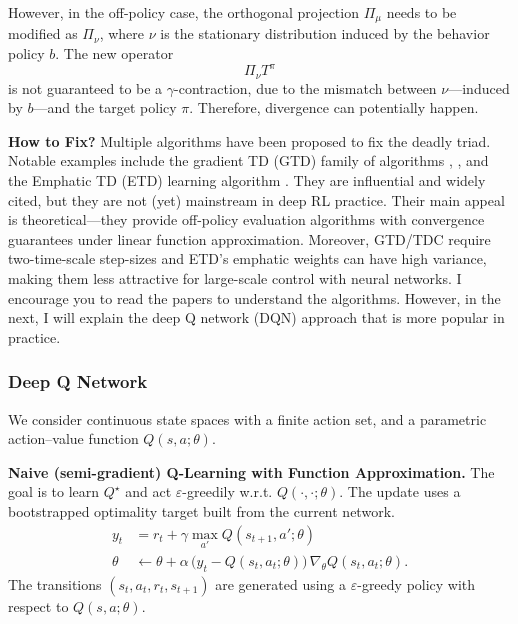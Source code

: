 \documentclass[
]{book}
\theoremstyle{definition}
\theoremstyle{definition}
\theoremstyle{definition}
\theoremstyle{definition}
\theoremstyle{remark}
\begin{document}
However, in the off-policy case, the orthogonal projection \(\Pi_\mu\) needs to be modified as \(\Pi_{\nu}\), where \(\nu\) is the stationary distribution induced by the behavior policy \(b\). The new operator
\[
\Pi_{\nu} T^\pi
\]
is not guaranteed to be a \(\gamma\)-contraction, due to the mismatch between \(\nu\)---induced by \(b\)---and the target policy \(\pi\). Therefore, divergence can potentially happen.

\textbf{How to Fix?} Multiple algorithms have been proposed to fix the deadly triad. Notable examples include the gradient TD (GTD) family of algorithms \citep{sutton2008convergent}, \citep{sutton2009fast}, and the Emphatic TD (ETD) learning algorithm \citep{mahmood2015emphatic}. They are influential and widely cited, but they are not (yet) mainstream in deep RL practice. Their main appeal is theoretical---they provide off-policy evaluation algorithms with convergence guarantees under linear function approximation. Moreover, GTD/TDC require two-time-scale step-sizes and ETD's emphatic weights can have high variance, making them less attractive for large-scale control with neural networks. I encourage you to read the papers to understand the algorithms. However, in the next, I will explain the deep Q network (DQN) approach that is more popular in practice.

\subsubsection{Deep Q Network}\label{DQN}

We consider continuous state spaces with a finite action set, and a parametric action--value function \(Q(s,a; \theta)\).

\textbf{Naive (semi-gradient) Q-Learning with Function Approximation.} The goal is to learn \(Q^\star\) and act \(\varepsilon\)-greedily w.r.t. \(Q(\cdot,\cdot; \theta)\). The update uses a bootstrapped optimality target built from the current network.
\begin{equation}
\begin{split}
y_t & = r_t + \gamma \max_{a'} Q(s_{t+1}, a';\theta) \\
\theta & \leftarrow \theta + \alpha \,\big(y_t - Q(s_t,a_t;\theta)\big)\,\nabla_\theta Q(s_t,a_t; \theta).
\end{split}
\label{eq:naiveQLearningFA}
\end{equation}
The transitions \((s_t,a_t,r_t,s_{t+1})\) are generated using a \(\varepsilon\)-greedy policy with respect to \(Q(s,a;\theta)\).
\end{document}

